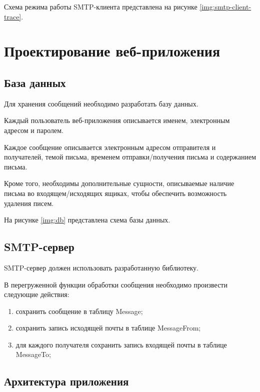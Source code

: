 Схема режима работы SMTP-клиента представлена на рисунке \ref{img:smtp-client-trace}.


\section{Проектирование веб-приложения}

\subsection{База данных}

Для хранения сообщений необходимо разработать базу данных.

Каждый пользователь веб-приложения описывается именем, электронным адресом и паролем.

Каждое сообщение описывается электронным адресом отправителя и получателей, темой письма, временем отправки/получения письма и содержанием письма.

Кроме того, необходимы дополнительные сущности, описываемые наличие письма во входящем/исходящих ящиках, чтобы обеспечить возможность удаления писем.

На рисунке \ref{img:db} представлена схема базы данных.


\subsection{SMTP-сервер}

SMTP-сервер должен использовать разработанную библиотеку.

В перегруженной функции обработки сообщения необходимо произвести следующие действия:
\begin{enumerate}
	\item сохранить сообщение в таблицу Message;
	\item сохранить запись исходящей почты в таблице MessageFrom;
	\item для каждого получателя сохранить запись входящей почты в таблице MessageTo;
\end{enumerate}

\subsection{Архитектура приложения}

